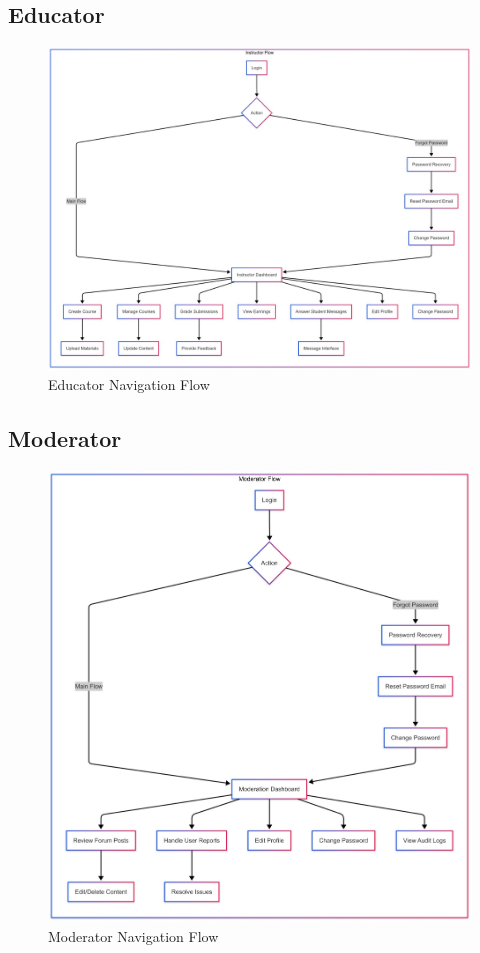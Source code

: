 \documentclass[a4paper, 11pt]{scrreprt}
\begin{document}
\subsection{Educator}
\begin{figure}[!htb]
    \centering
    \includegraphics[height=0.3\textheight]{UI/eduFlow.jpg}
    \caption{Educator Navigation Flow}
\end{figure}

\subsection{Moderator}
\begin{figure}[!htb]
    \centering
    \includegraphics[height=0.5\textheight]{UI/modFlow.jpg}
    \caption{Moderator Navigation Flow}
\end{figure}
\end{document}
